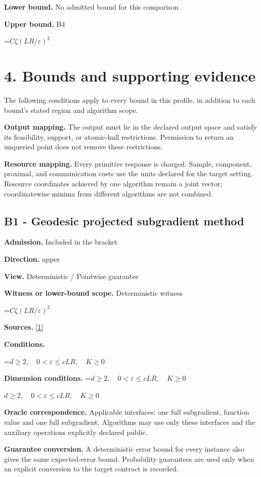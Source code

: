 \documentclass[10pt,a4paper]{article}
\newcommand{\AtlasMath}[1]{\par\begingroup\centering\setbox0=\hbox{$\displaystyle #1$}\ifdim\wd0>1.4\linewidth\typeout{ATLAS WIDE FORMULA: \the\wd0}\fi\ifdim\wd0>\linewidth\resizebox{\linewidth}{!}{\box0}\else\box0\fi\par\endgroup}
\newcommand{\AtlasInlineMath}[1]{\begingroup\setbox0=\hbox{$#1$}\ifdim\wd0>.4\linewidth\endgroup\AtlasMath{#1}\else\endgroup$#1$\fi}
\begin{document}
\textbf{Lower bound.} No admitted bound for this comparison

\textbf{Upper bound.} B4

\AtlasMath{C\zeta(LR/\varepsilon)^2}
\section{4. Bounds and supporting evidence}
The following conditions apply to every bound in this profile, in addition to each bound's stated region and algorithm scope.

\textbf{Output mapping.} The output must lie in the declared output space and satisfy its feasibility, support, or atomic-hull restrictions. Permission to return an unqueried point does not remove these restrictions.

\textbf{Resource mapping.} Every primitive response is charged. Sample, component, proximal, and communication costs use the units declared for the target setting. Resource coordinates achieved by one algorithm remain a joint vector; coordinatewise minima from different algorithms are not combined.

\subsection{B1 - Geodesic projected subgradient method}
\textbf{Admission.} Included in the bracket

\textbf{Direction.} upper

\textbf{View.} Deterministic / Pointwise guarantee

\textbf{Witness or lower-bound scope.} Deterministic witness

\AtlasMath{C\zeta(LR/\varepsilon)^2}
\textbf{Sources.} \href{https://proceedings.mlr.press/v49/zhang16b.pdf}{[1]}

\textbf{Conditions.} 
\AtlasMath{d\ge2,\quad0<\varepsilon\le cLR,\quad K\ge0}


\textbf{Dimension conditions.} \AtlasInlineMath{d\ge2,\quad0<\varepsilon\le cLR,\quad K\ge0}

\textbf{Oracle correspondence.} Applicable interfaces: one full subgradient, function value and one full subgradient. Algorithms may use only these interfaces and the auxiliary operations explicitly declared public.

\textbf{Guarantee conversion.} A deterministic error bound for every instance also gives the same expected-error bound. Probability guarantees are used only when an explicit conversion to the target contract is recorded.
\end{document}
